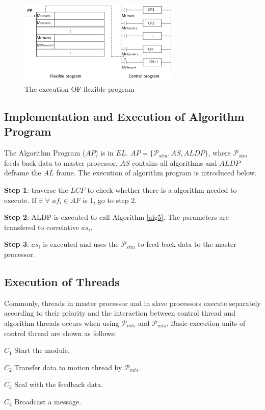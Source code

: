 \documentclass[journal,UTF8]{IEEEtran}
\begin{document}
\begin{figure}
	\centering
	\includegraphics[width=3in]{fig/execution.png}
	\caption{ The execution OF flexible program}
	\label{fig:execution}
\end{figure}

\subsection{Implementation and Execution of Algorithm Program }
The Algorithm Program ($AP$) is in $EL$. $AP=\{\mathcal{P}_{stm}, AS, ALDP\}$, where $\mathcal{P}_{stm}$ feeds back data to master processor, $AS$ contains all algorithms and $ALDP$ deframe the $AL$ frame. The execution of algorithm program is introduced below.

\textbf{Step 1}: traverse the $LCF$ to check whether there is a algorithm needed to execute. If $\exists$ $\forall$ $af_i \in AF$ is 1, go to step 2.

\textbf{Step 2}: ALDP is executed to call Algorithm \ref{alg5}. The parameters are transfered to correlative $as_i$.

\textbf{Step 3}: $as_i$ is executed and uses the $\mathcal{P}_{stm}$ to feed back data to the master processor. 

\subsection{Execution of Threads}
 Commonly, threads in master processor and in slave processors execute separately according to their priority and the interaction between control thread and algorithm threads occurs when using $\mathcal{P}_{mts}$ and $\mathcal{P}_{mts}$. Basic execution units of control thread are shown as follows:

\textbf{$C_{1}$} Start the module.

\textbf{$C_{2}$} Transfer data to motion thread by $\mathcal{P}_{mts}$.

\textbf{$C_{3}$} Seal with the feedback data.

\textbf{$C_{4}$} Broadcast a message.
\end{document}
